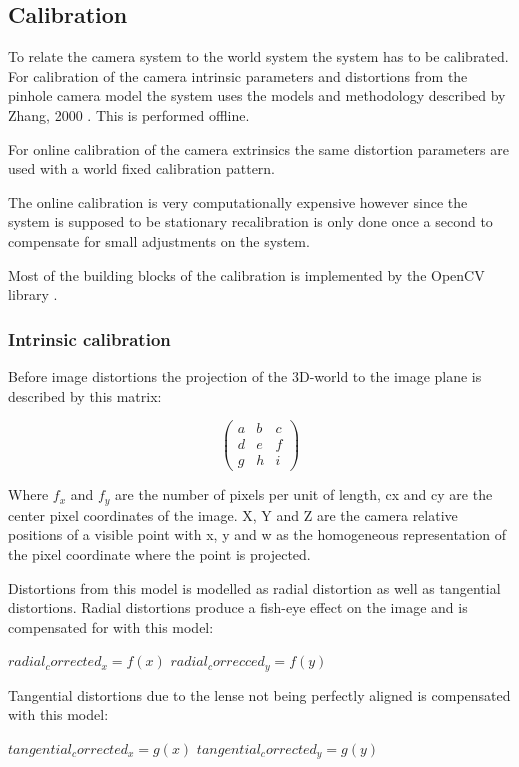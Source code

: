 
\subsection{Calibration}
To relate the camera system to the world system the system has to be calibrated. For calibration of the camera intrinsic parameters and distortions from the pinhole camera model the system uses the models and methodology described by Zhang, 2000 \cite{zhang}. This is performed offline.

For online calibration of the camera extrinsics the same distortion parameters are used with a world fixed calibration pattern.

The online calibration is very computationally expensive however since the system is supposed to be stationary recalibration is only done once a second to compensate for small adjustments on the system.

Most of the building blocks of the calibration is implemented by the OpenCV library \cite{camcal}. 

\subsubsection{Intrinsic calibration}
Before image distortions the projection of the 3D-world to the image plane is described by this matrix:

\[ \left( \begin{array}{ccc}
a & b & c \\
d & e & f \\
g & h & i \end{array} \right)\] 

Where $f_x$ and $f_y$ are the number of pixels per unit of length, cx and cy are the center pixel coordinates of the image. X, Y and Z are the camera relative positions of a visible point with x, y and w as the homogeneous representation of the pixel coordinate where the point is projected.

Distortions from this model is modelled as radial distortion as well as tangential distortions. Radial distortions produce a fish-eye effect on the image and is compensated for with this model:

$radial_corrected_x = f(x)$
$radial_correcced_y = f(y)$

Tangential distortions due to the lense not being perfectly aligned is compensated with this model:

$tangential_corrected_x = g(x)$
$tangential_corrected_y = g(y)$

